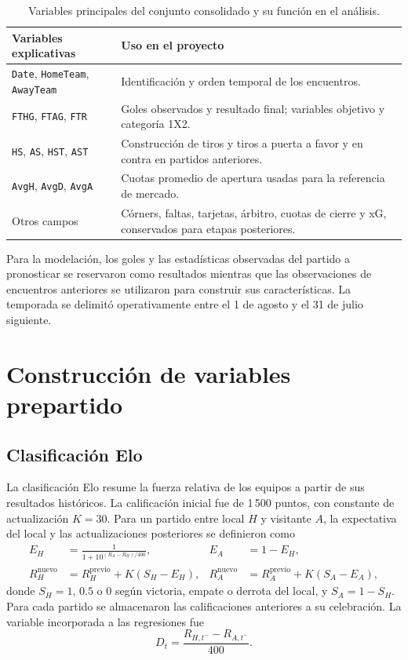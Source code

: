 \documentclass[11pt,a4paper]{article}
\newcommand{\code}[1]{\texttt{#1}}
\begin{document}
\begin{table}[H]
\centering\small
\caption{Variables principales del conjunto consolidado y su función en el análisis.}
\begin{tabularx}{\textwidth}{p{}X}
\toprule
Variables explicativas & Uso en el proyecto\\
\midrule
\code{Date}, \code{HomeTeam}, \code{AwayTeam} & Identificación y orden temporal de los encuentros.\\
\code{FTHG}, \code{FTAG}, \code{FTR} & Goles observados y resultado final; variables objetivo y categoría 1X2.\\
\code{HS}, \code{AS}, \code{HST}, \code{AST} & Construcción de tiros y tiros a puerta a favor y en contra en partidos anteriores.\\
\code{AvgH}, \code{AvgD}, \code{AvgA} & Cuotas promedio de apertura usadas para la referencia de mercado.\\
Otros campos & Córners, faltas, tarjetas, árbitro, cuotas de cierre y xG, conservados para etapas posteriores.\\
\bottomrule
\end{tabularx}
\end{table}

Para la modelación, los goles y las estadísticas observadas del partido a pronosticar se reservaron como resultados mientras que las observaciones de encuentros anteriores se utilizaron para construir sus características. La temporada se delimitó operativamente entre el 1 de agosto y el 31 de julio siguiente.

\section{Construcción de variables prepartido}
\subsection{Clasificación Elo}
La clasificación Elo resume la fuerza relativa de los equipos a partir de sus resultados históricos. La calificación inicial fue de 1\,500 puntos, con constante de actualización $K=30$. Para un partido entre local $H$ y visitante $A$, la expectativa del local y las actualizaciones posteriores se definieron como
\begin{align}
E_H&=\frac{1}{1+10^{(R_A-R_H)/400}}, & E_A&=1-E_H,\\
R_H^{\mathrm{nuevo}}&=R_H^{\mathrm{previo}}+K(S_H-E_H), &
R_A^{\mathrm{nuevo}}&=R_A^{\mathrm{previo}}+K(S_A-E_A),
\end{align}
donde $S_H=1$, $0.5$ o $0$ según victoria, empate o derrota del local, y $S_A=1-S_H$. Para cada partido se almacenaron las calificaciones anteriores a su celebración. La variable incorporada a las regresiones fue
\begin{equation}
D_t=\frac{R_{H,t^-}-R_{A,t^-}}{400}.
\label{eq:elo}
\end{equation}
\end{document}

